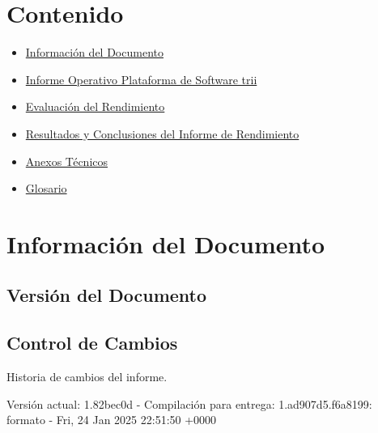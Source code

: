 \documentclass[
  paper=a4,
  ,captions=tableheading
]{scrartcl}
\providecommand{\tightlist}{%
  \setlength{\itemsep}{0pt}\setlength{\parskip}{0pt}}
\renewenvironment{quote}{\begin{customblockquote}\list{}{\rightmargin=0em\leftmargin=0em}%
\item\relax\color{blockquote-text}\ignorespaces}{\unskip\unskip\endlist\end{customblockquote}}
\begin{document}



\section{Contenido}\label{sec:contenido}

\begin{itemize}
\tightlist
\item
  \hyperref[informaciuxf3n-del-documento]{Información del Documento}
\item
  \hyperref[informe-operativo-plataforma-de-software-]{Informe Operativo
  Plataforma de Software trii}
\item
  \hyperref[evaluaciuxf3n-del-rendimiento]{Evaluación del Rendimiento}
\item
  \hyperref[resultados-y-conclusiones-del-informe-de-rendimiento]{Resultados
  y Conclusiones del Informe de Rendimiento}
\item
  \hyperref[anexos-tuxe9cnicos]{Anexos Técnicos}
\item
  \hyperref[glosario]{Glosario}
\end{itemize}

\newpage

\section{Información del
Documento}\label{sec:informaciuxf3n-del-documento}

\subsection{Versión del Documento}\label{sec:versiuxf3n-del-documento}

\begin{quote}
\end{quote}

\subsection{Control de Cambios}\label{sec:control-de-cambios}

Historia de cambios del informe.

Versión actual: 1.82bec0d - Compilación para entrega: 1.ad907d5.f6a8199:
formato - Fri, 24 Jan 2025 22:51:50 +0000
\end{document}
